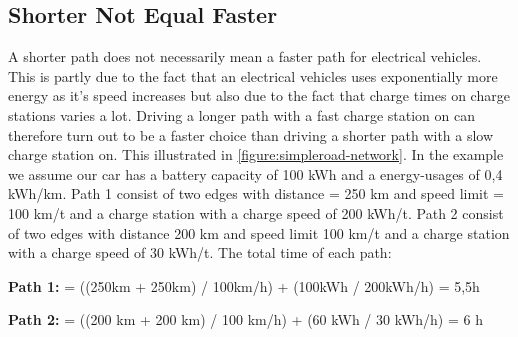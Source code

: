 \subsection{Shorter Not Equal Faster}

A shorter path does not necessarily mean a faster path for electrical vehicles. 
This is partly due to the fact that an electrical vehicles uses exponentially more energy 
as it's speed increases but also due to the fact that charge times on charge stations
varies a lot. Driving a longer path with a fast charge station on can therefore turn out to
be a faster choice than driving a shorter path with a slow charge station on. This illustrated 
in \ref{figure:simpleroad-network}. In the example we assume our car has a battery capacity of 100 kWh and a energy-usages of
0,4 kWh/km. Path 1 consist of two edges with distance = 250 km and speed limit = 100 km/t
and a charge station with a charge speed of 200 kWh/t. Path 2 consist of two edges with
distance 200 km and speed limit 100 km/t and a charge station with a charge speed of 30 kWh/t.
The total time of each path:
				
\textbf{Path 1:}  = ((250km + 250km) / 100km/h) + (100kWh / 200kWh/h) = 5,5h
				
\textbf{Path 2:}  = ((200 km + 200 km) / 100 km/h) + (60 kWh / 30 kWh/h) = 6 h